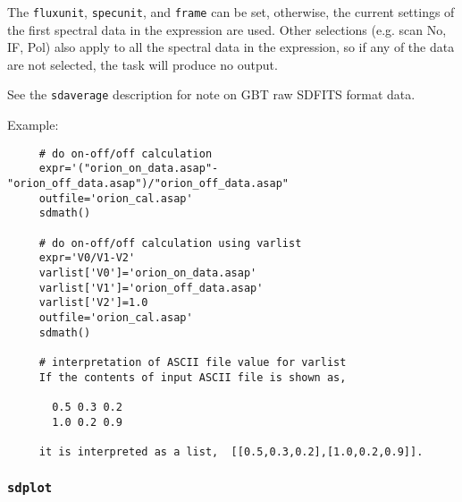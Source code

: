 The {\tt fluxunit}, {\tt specunit}, and {\tt frame} can be set, otherwise, the current
settings of the first spectral data in the expression are used.  
Other selections (e.g. scan No, IF, Pol) also apply to all 
the spectral data in the expression, so if any of the data are
not selected, the task will produce no output. 
     
See the {\tt sdaverage} description for note on GBT raw SDFITS format data.

Example:
\begin{verbatim}
     # do on-off/off calculation
     expr='("orion_on_data.asap"-"orion_off_data.asap")/"orion_off_data.asap"
     outfile='orion_cal.asap'
     sdmath()
     
     # do on-off/off calculation using varlist
     expr='V0/V1-V2'
     varlist['V0']='orion_on_data.asap'
     varlist['V1']='orion_off_data.asap'
     varlist['V2']=1.0
     outfile='orion_cal.asap'
     sdmath()
     
     # interpretation of ASCII file value for varlist
     If the contents of input ASCII file is shown as,

       0.5 0.3 0.2
       1.0 0.2 0.9

     it is interpreted as a list,  [[0.5,0.3,0.2],[1.0,0.2,0.9]].
\end{verbatim}


\subsubsection{{\tt sdplot}}
\label{section:sd.sdtasks.tasks.sdplot}


